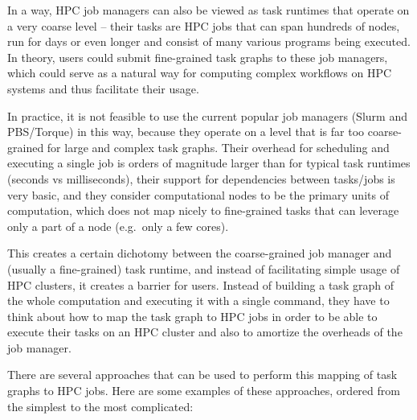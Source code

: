 In a way, HPC job managers can also be viewed as task runtimes that operate on a very coarse
level -- their tasks are HPC jobs that can span hundreds of nodes, run for days or even longer and
consist of many various programs being executed. In theory, users could submit fine-grained task
graphs to these job managers, which could serve as a natural way for computing complex workflows on
HPC systems and thus facilitate their usage.

In practice, it is not feasible to use the current popular job managers (Slurm and PBS/Torque) in
this way, because they operate on a level that is far too coarse-grained for large and complex task
graphs. Their overhead for scheduling and executing a single job is orders of magnitude larger
than for typical task runtimes (seconds vs milliseconds), their support for dependencies between
tasks/jobs is very basic, and they consider computational nodes to be the primary units of
computation, which does not map nicely to fine-grained tasks that can leverage only a part of a
node (e.g.\ only a few cores).

This creates a certain dichotomy between the coarse-grained job manager and (usually a
fine-grained) task runtime, and instead of facilitating simple usage of HPC clusters, it creates a
barrier for users. Instead of building a task graph of the whole computation and executing it with
a single command, they have to think about how to map the task graph to HPC jobs in order to be
able to execute their tasks on an HPC cluster and also to amortize the overheads of the job
manager.

There are several approaches that can be used to perform this mapping of task graphs to HPC jobs.
Here are some examples of these approaches, ordered from the simplest to the most complicated:

